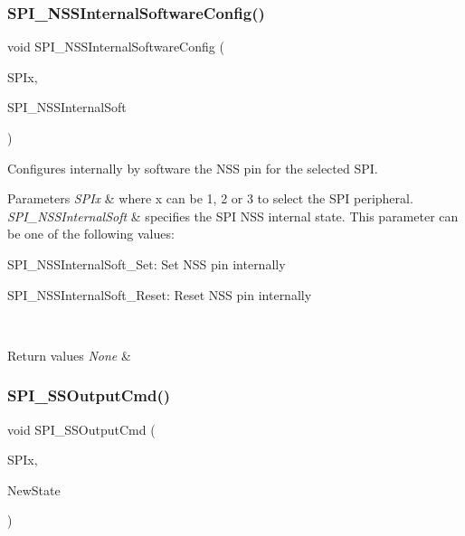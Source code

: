 \subsubsection{\texorpdfstring{SPI\_NSSInternalSoftwareConfig()}{SPI\_NSSInternalSoftwareConfig()}}
{\footnotesize\ttfamily void S\+P\+I\+\_\+\+N\+S\+S\+Internal\+Software\+Config (\begin{DoxyParamCaption}\item[{\mbox{\hyperlink{struct_s_p_i___type_def}{S\+P\+I\+\_\+\+Type\+Def}} $\ast$}]{S\+P\+Ix,  }\item[{uint16\+\_\+t}]{S\+P\+I\+\_\+\+N\+S\+S\+Internal\+Soft }\end{DoxyParamCaption})}



Configures internally by software the N\+SS pin for the selected S\+PI. 


\begin{DoxyParams}{Parameters}
{\em S\+P\+Ix} & where x can be 1, 2 or 3 to select the S\+PI peripheral. \\
\hline
{\em S\+P\+I\+\_\+\+N\+S\+S\+Internal\+Soft} & specifies the S\+PI N\+SS internal state. This parameter can be one of the following values\+: \begin{DoxyItemize}
\item S\+P\+I\+\_\+\+N\+S\+S\+Internal\+Soft\+\_\+\+Set\+: Set N\+SS pin internally \item S\+P\+I\+\_\+\+N\+S\+S\+Internal\+Soft\+\_\+\+Reset\+: Reset N\+SS pin internally \end{DoxyItemize}
\\
\hline
\end{DoxyParams}

\begin{DoxyRetVals}{Return values}
{\em None} & \\
\hline
\end{DoxyRetVals}
\mbox{\label{group___s_p_i___private___functions_ga4ec54abdedf6cd17403d853a926d91c1}} 
\subsubsection{\texorpdfstring{SPI\_SSOutputCmd()}{SPI\_SSOutputCmd()}}
{\footnotesize\ttfamily void S\+P\+I\+\_\+\+S\+S\+Output\+Cmd (\begin{DoxyParamCaption}\item[{\mbox{\hyperlink{struct_s_p_i___type_def}{S\+P\+I\+\_\+\+Type\+Def}} $\ast$}]{S\+P\+Ix,  }\item[{\mbox{\hyperlink{group___exported__types_gac9a7e9a35d2513ec15c3b537aaa4fba1}{Functional\+State}}}]{New\+State }\end{DoxyParamCaption})}



